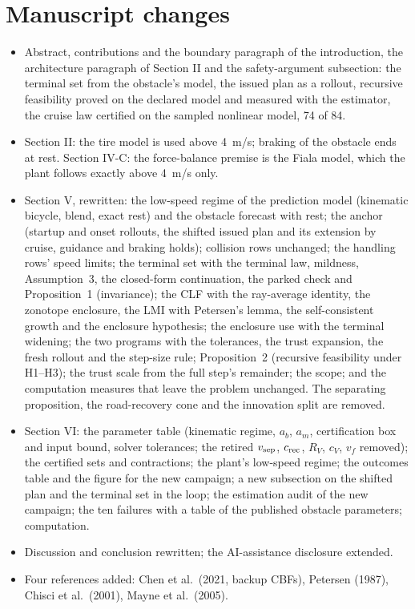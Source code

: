 \documentclass[11pt]{article}
\begin{document}
\section{Manuscript changes}
\begin{itemize}
\item Abstract, contributions and the boundary paragraph of the
  introduction, the architecture paragraph of Section II and the
  safety-argument subsection: the terminal set from the obstacle's model,
  the issued plan as a rollout, recursive feasibility proved on the declared
  model and measured with the estimator, the cruise law certified on the
  sampled nonlinear model, 74 of 84.
\item Section II: the tire model is used above 4~m/s; braking of the
  obstacle ends at rest. Section IV-C: the force-balance premise is the Fiala
  model, which the plant follows exactly above 4~m/s only.
\item Section V, rewritten: the low-speed regime of the prediction model
  (kinematic bicycle, blend, exact rest) and the obstacle forecast with rest;
  the anchor (startup and onset rollouts, the shifted issued plan and its
  extension by cruise, guidance and braking holds); collision rows
  unchanged; the handling rows' speed limits; the terminal set with the
  terminal law, mildness, Assumption~3, the closed-form continuation, the
  parked check and Proposition~1 (invariance); the CLF with the ray-average
  identity, the zonotope enclosure, the LMI with Petersen's lemma, the
  self-consistent growth and the enclosure hypothesis; the enclosure use with
  the terminal widening; the two programs with the tolerances, the trust
  expansion, the fresh rollout and the step-size rule; Proposition~2
  (recursive feasibility under H1--H3); the trust scale from the full step's
  remainder; the scope; and the computation measures that leave the problem
  unchanged. The separating proposition, the road-recovery cone and the
  innovation split are removed.
\item Section VI: the parameter table (kinematic regime, $a_b$, $a_m$,
  certification box and input bound, solver tolerances; the retired
  $v_{\rm sep}$, $c_{\rm rec}$, $R_V$, $c_V$, $v_f$ removed); the certified sets
  and contractions; the plant's low-speed regime; the outcomes table and the
  figure for the new campaign; a new subsection on the shifted plan and the
  terminal set in the loop; the estimation audit of the new campaign; the ten
  failures with a table of the published obstacle parameters; computation.
\item Discussion and conclusion rewritten; the AI-assistance disclosure
  extended.
\item Four references added: Chen et al.\ (2021, backup CBFs), Petersen
  (1987), Chisci et al.\ (2001), Mayne et al.\ (2005).
\end{itemize}
\end{document}
